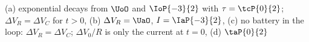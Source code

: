 (a) exponential decays from $\UoO$ and $\IoP{-3}{2}$ with $\tau = \tcP{0}{2}$; $\Delta V_R = \Delta V_C$ for $t > 0$, (b) $\Delta V_R = \UaO$, $I = \IaP{-3}{2}$, (c) no battery in the loop: $\Delta V_R = \Delta V_C$; $\Delta V_0/R$ is only the current at $t = 0$, (d) $\taP{0}{2}$
